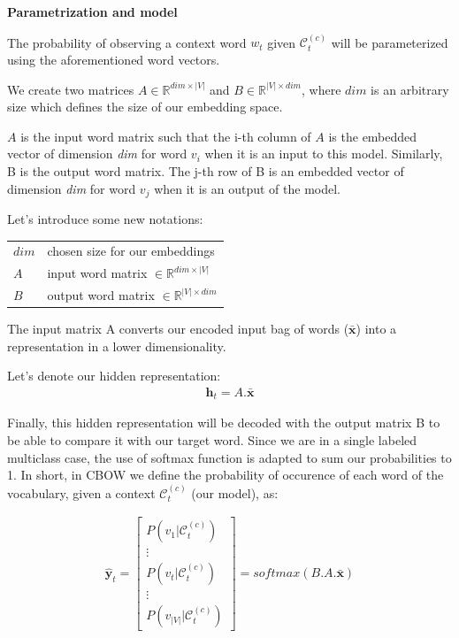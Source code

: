 \textbf{Parametrization and model}

The probability of observing a context word $w_t$ given $\mathcal{C}_t^{(c)}$ will be parameterized using the aforementioned word vectors.

We create two matrices $A \in \mathbb{R}^{dim \times |V|}$ and $B \in \mathbb{R}^{|V| \times dim}$, where $dim$ is an arbitrary size which defines the size of our embedding space.

$A$ is the input word matrix such that the i-th column of $A$ is the embedded vector of dimension \textit{dim} for word $v_{i}$ when it is an input to this model. 
Similarly, B is the output word matrix. The j-th row of B is an embedded vector of dimension \textit{dim} for word $v_j$ when it is an output of the model. 


Let's introduce some new notations:

{\ttfamily
\begin{table}[H]
    \centering
    \begin{tabular}{ll}
        \toprule
        $dim$ 				& chosen size for our embeddings \\
        $A$ 				& input word matrix $\in \mathbb{R}^{dim \times |V|}$ \\
        $B$ 				& output word matrix $\in \mathbb{R}^{|V| \times dim}$ \\
        \bottomrule
    \end{tabular}
\end{table}
}

The input matrix A converts our encoded input bag of words ($\mathbf{\bar x} $) into a representation in a lower dimensionality.

Let's denote our hidden representation:
\begin{align}
 \mathbf{h}_t = A.\mathbf{\bar x}
\end{align}

Finally, this hidden representation will be decoded with the output matrix B to be able to compare it with our target word. Since we are in a single labeled multiclass case, the use of softmax function is adapted to sum our probabilities to 1. In short, in CBOW we define the probability of occurence of each word of the vocabulary, given a context $\mathcal{C}_t^{(c)}$ (our model), as:

\begin{align}
 \mathbf{\hat y}_t = 
	\begin{bmatrix} 
		P(v_1 | \mathcal{C}_t^{(c)}) \\
		\vdots \\
		P(v_t | \mathcal{C}_t^{(c)})\\
		\vdots \\
		P(v_{|V|} | \mathcal{C}_t^{(c)})
	\end{bmatrix} = 
	softmax(B.A.\mathbf{\bar x} )
\end{align}

